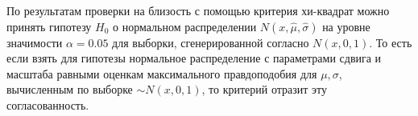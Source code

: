 \documentclass[../body.tex]{subfiles}
\begin{document}
	По результатам проверки на близость с помощью критерия хи-квадрат можно принять гипотезу $H_0$ о нормальном распределении $N(x, \hat{\mu}, \hat{\sigma})$ на уровне значимости $ \alpha = 0.05$ для выборки, сгенерированной согласно $N(x, 0, 1)$. То есть если взять для гипотезы нормальное распределение с параметрами сдвига и масштаба равными оценкам максимального правдоподобия для $\mu, \sigma$, вычисленным по выборке $\sim N(x, 0, 1)$, то критерий отразит эту согласованность.
\end{document}
